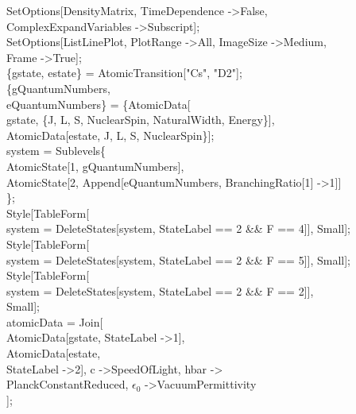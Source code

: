 SetOptions[DensityMatrix, TimeDependence -\textgreater False, \\
  ComplexExpandVariables -\textgreater Subscript];\\
SetOptions[ListLinePlot, PlotRange -\textgreater All, ImageSize -\textgreater Medium, \\
  Frame -\textgreater True];\\
\{gstate, estate\} = AtomicTransition["Cs", "D2"];\\
\{gQuantumNumbers, \\
   eQuantumNumbers\} = \{AtomicData[\\
    gstate, \{J, L, S, NuclearSpin, NaturalWidth, Energy\}],\\
   AtomicData[estate, {J, L, S, NuclearSpin\}]};\\
system = Sublevels\@\{\\
    AtomicState[1, gQuantumNumbers], \\
    AtomicState[2, Append[eQuantumNumbers, BranchingRatio[1] -\textgreater 1]]\\
    \};\\

Style[TableForm[\\
   system = DeleteStates[system, StateLabel == 2 \&\& F == 4]], Small];\\
Style[TableForm[\\
   system = DeleteStates[system, StateLabel == 2 \&\& F == 5]], Small];\\
Style[TableForm[\\
   system = DeleteStates[system, StateLabel == 2 \&\& F == 2]],\\
  Small];\\
atomicData = Join[\\
   AtomicData[gstate, StateLabel -\textgreater 1],\\
   AtomicData[estate, \\
    StateLabel -\textgreater 2], {c -\textgreater SpeedOfLight, hbar -\textgreater \\
     PlanckConstantReduced, $\epsilon_0$ -\textgreater VacuumPermittivity}\\
   ];\\


